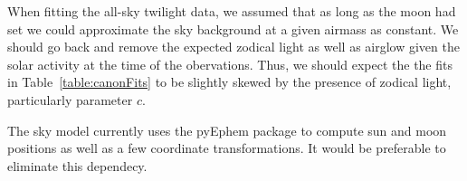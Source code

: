 \documentclass{emulateapj}  %
\begin{document}
When fitting the all-sky twilight data, we assumed that as long as the moon had set we could approximate the sky background at a given airmass as constant. We should go back and remove the expected zodical light as well as airglow given the solar activity at the time of the obervations. Thus, we should expect the the fits in Table~\ref{table:canonFits} to be slightly skewed by the presence of zodical light, particularly parameter $c$.  

The sky model currently uses the pyEphem package to compute sun and moon positions as well as a few coordinate transformations. It would be preferable to eliminate this dependecy.  



\end{document}
